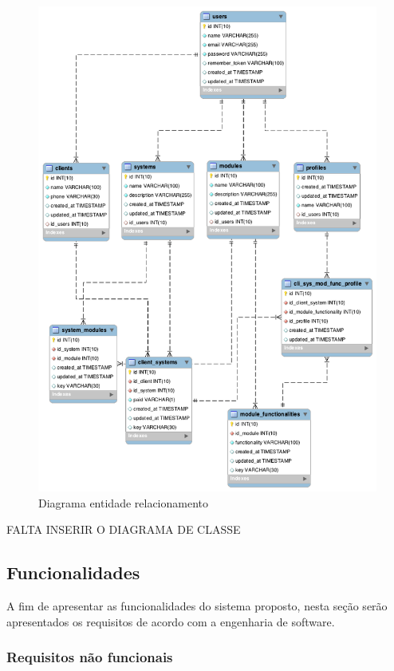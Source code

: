 \begin{figure}
	\label{fig:DER}
	\includegraphics[width=1\textwidth]{img/DER}
	\caption{Diagrama entidade relacionamento}
\end{figure}


FALTA INSERIR O DIAGRAMA DE CLASSE


\subsection{Funcionalidades}


A fim de apresentar as funcionalidades do sistema proposto, nesta seção serão apresentados os requisitos de acordo com a engenharia de software.


\subsubsection{Requisitos não funcionais}



